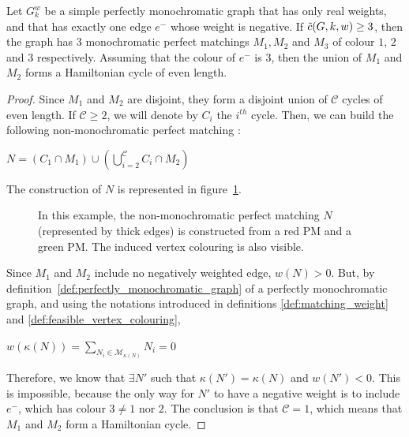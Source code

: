 \begin{observation}
    \label{obs:one_neg_edge_ham_cycle}
    Let $G_k^w$ be a simple perfectly monochromatic graph that has only real weights, and that has exactly one edge $e^-$ whose weight is negative.
    If $\Tilde{c}(G, k, w) \geq 3$, then the graph has $3$ monochromatic perfect matchings $M_1, M_2$ and $M_3$ of colour $1$, $2$ and $3$ respectively.
    Assuming that the colour of $e^-$ is $3$, then the union of $M_1$ and $M_2$ forms a Hamiltonian cycle of even length.
\end{observation}

\begin{proof}
    Since $M_1$ and $M_2$ are disjoint, they form a disjoint union of $\mathcal{C}$ cycles of even length.
    If $\mathcal{C} \geq 2$, we will denote by $C_i$ the $i^{th}$ cycle.
    Then, we can build the following non-monochromatic perfect matching :

    \begin{center}
        $N = (C_1 \cap M_1) \cup (\bigcup\limits_{i=2}^{\mathcal{C}} C_i \cap M_2)$
    \end{center}

    The construction of $N$ is represented in figure~\ref{fig:proof_unique_neg_ham}.

    \begin{figure}[H]
        \caption{In this example, the non-monochromatic perfect matching $N$ (represented by thick edges) is constructed from a red PM and a green PM. The induced vertex colouring is also visible.}
        \label{fig:proof_unique_neg_ham}
    \end{figure}

    Since $M_1$ and $M_2$ include no negatively weighted edge, $w(N) > 0$.
    But, by definition~\ref{def:perfectly_monochromatic_graph} of a perfectly monochromatic graph, and using the notations introduced in definitions \ref{def:matching_weight} and \ref{def:feasible_vertex_colouring},

    \begin{center}
        $w(\kappa(N)) = \sum\limits_{N_i \in \mathcal{M}_{\kappa(N)}} N_i = 0$
    \end{center}

    Therefore, we know that $\exists N'$ such that $\kappa(N') = \kappa(N)$ and $w(N') < 0$. This is impossible, because the only way for $N'$ to have a negative weight is to include $e^-$, which has colour $3 \neq 1$ nor $2$. The conclusion is that $\mathcal{C} = 1$, which means that $M_1$ and $M_2$ form a Hamiltonian cycle.
\end{proof}


